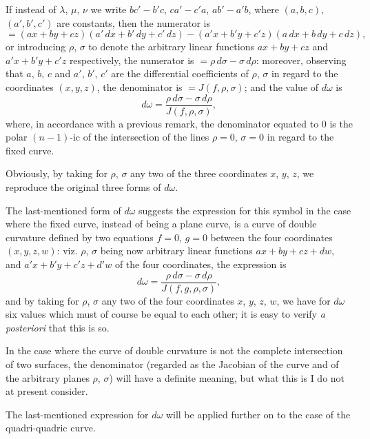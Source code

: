\documentclass[11pt,a4paper]{book}
\begin{document}
If instead of $\lambda$, $\mu$, $\nu$ we write $bc' - b'c$, $ca' - c'a$, $ab' - a'b$, where $(a, b, c)$, $(a', b', c')$ are constants, then the numerator is
\[
= (ax + by + cz)(a'\,dx + b'\,dy + c'\,dz) - (a'x + b'y + c'z)(a\,dx + b\,dy + c\,dz),
\]
or introducing $\rho$, $\sigma$ to denote the arbitrary linear functions $ax + by + cz$ and $a'x + b'y + c'z$ respectively, the numerator is $= \rho\,d\sigma - \sigma\,d\rho$: moreover, observing that $a$, $b$, $c$ and $a'$, $b'$, $c'$ are the differential coefficients of $\rho$, $\sigma$ in regard to the coordinates $(x, y, z)$, the denominator is $= J(f, \rho, \sigma)$; and the value of $d\omega$ is
\[
d\omega = \frac{\rho\,d\sigma - \sigma\,d\rho}{J(f, \rho, \sigma)},
\]
where, in accordance with a previous remark, the denominator equated to $0$ is the polar $(n - 1)$-ic of the intersection of the lines $\rho = 0$, $\sigma = 0$ in regard to the fixed curve.

Obviously, by taking for $\rho$, $\sigma$ any two of the three coordinates $x$, $y$, $z$, we reproduce the original three forms of $d\omega$.

\begin{art}\label{art:87}
The last-mentioned form of $d\omega$ suggests the expression for this symbol in the case where the fixed curve, instead of being a plane curve, is a curve of double curvature defined by two equations $f = 0$, $g = 0$ between the four coordinates $(x, y, z, w)$: viz. $\rho$, $\sigma$ being now arbitrary linear functions $ax + by + cz + dw$, and $a'x + b'y + c'z + d'w$ of the four coordinates, the expression is
\[
d\omega = \frac{\rho\,d\sigma - \sigma\,d\rho}{J(f, g, \rho, \sigma)},
\]
and by taking for $\rho$, $\sigma$ any two of the four coordinates $x$, $y$, $z$, $w$, we have for $d\omega$ six values which must of course be equal to each other; it is easy to verify \textit{a posteriori} that this is so.

In the case where the curve of double curvature is not the complete intersection of two surfaces, the denominator (regarded as the Jacobian of the curve and of the arbitrary planes $\rho$, $\sigma$) will have a definite meaning, but what this is I do not at present consider.

The last-mentioned expression for $d\omega$ will be applied further on to the case of the quadri-quadric curve.
\end{art}

\newpage
\end{document}
